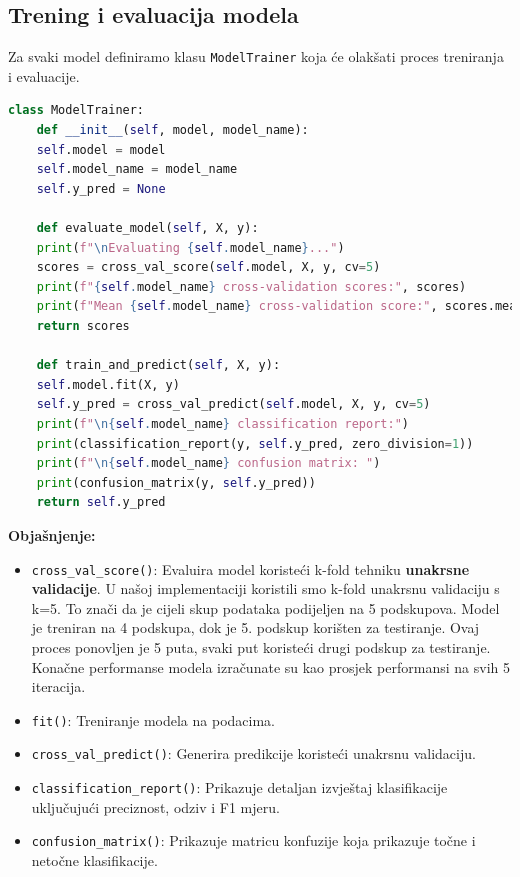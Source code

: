 \documentclass[zavrsnirad,upload]{fer}
\begin{document}
\subsection{Trening i evaluacija modela}

Za svaki model definiramo klasu \texttt{ModelTrainer} koja će olakšati proces treniranja i evaluacije.

\begin{lstlisting}[language=Python, caption={Klasa ModelTrainer}]
	class ModelTrainer:
	def __init__(self, model, model_name):
	self.model = model
	self.model_name = model_name
	self.y_pred = None
	
	def evaluate_model(self, X, y):
	print(f"\nEvaluating {self.model_name}...")
	scores = cross_val_score(self.model, X, y, cv=5)
	print(f"{self.model_name} cross-validation scores:", scores)
	print(f"Mean {self.model_name} cross-validation score:", scores.mean())
	return scores
	
	def train_and_predict(self, X, y):
	self.model.fit(X, y)
	self.y_pred = cross_val_predict(self.model, X, y, cv=5)
	print(f"\n{self.model_name} classification report:")
	print(classification_report(y, self.y_pred, zero_division=1))
	print(f"\n{self.model_name} confusion matrix: ")
	print(confusion_matrix(y, self.y_pred))
	return self.y_pred
\end{lstlisting}

\noindent \textbf{Objašnjenje:}
\begin{itemize}
	\item \texttt{cross\_val\_score()}: Evaluira model koristeći k-fold tehniku \textbf{unakrsne validacije}. U našoj implementaciji koristili smo k-fold unakrsnu validaciju s k=5. To znači da je cijeli skup podataka podijeljen na 5 podskupova. Model je treniran na 4 podskupa, dok je 5. podskup korišten za testiranje. Ovaj proces ponovljen je 5 puta, svaki put koristeći drugi podskup za testiranje. Konačne performanse modela izračunate su kao prosjek performansi na svih 5 iteracija.
	\item \texttt{fit()}: Treniranje modela na podacima.
	\item \texttt{cross\_val\_predict()}: Generira predikcije koristeći unakrsnu validaciju.
	\item \texttt{classification\_report()}: Prikazuje detaljan izvještaj klasifikacije uključujući preciznost, odziv i F1 mjeru.
	\item \texttt{confusion\_matrix()}: Prikazuje matricu konfuzije koja prikazuje točne i netočne klasifikacije.
\end{itemize}
\end{document}

